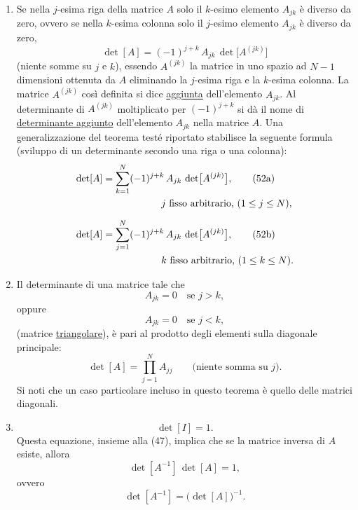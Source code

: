 \documentclass[11pt, a4paper]{book}
\numberwithin{equation}{section}
\begin{document}
\begin{enumerate}
\item Se nella $j$-esima riga della matrice $A$ solo il $k$-esimo elemento $A_{jk}$ è diverso da zero, ovvero se nella $k$-esima colonna solo il $j$-esimo elemento $A_{jk}$ è diverso da zero,
\begin{equation}
    \det[A] = (-1)^{j+k}\, A_{jk}\, \det\bigl[A^{(jk)}\bigr]
    \tag{51}
\end{equation}
(niente somme su $j$ e $k$), essendo $A^{(jk)}$ la matrice in uno spazio ad $N-1$ dimensioni ottenuta da $A$ eliminando la $j$-esima riga e la $k$-esima colonna. La matrice $A^{(jk)}$ così definita si dice \underline{aggiunta} dell'elemento $A_{jk}$. Al determinante di $A^{(jk)}$ moltiplicato per $(-1)^{j+k}$ si dà il nome di \underline{determinante aggiunto} dell'elemento $A_{jk}$ nella matrice $A$. Una generalizzazione del teorema testé riportato stabilisce la seguente formula (sviluppo di un determinante secondo una riga o una colonna):
\begin{align}
    \det[A] &= \sum_{k=1}^{N} (-1)^{j+k}\, A_{jk}\, \det\bigl[A^{(jk)}\bigr],
    \tag{52a} \\
    &\hspace{6em} j \text{ fisso arbitrario, } (1 \leq j \leq N), \notag \\[6pt]
    \det[A] &= \sum_{j=1}^{N} (-1)^{j+k}\, A_{jk}\, \det\bigl[A^{(jk)}\bigr],
    \tag{52b} \\
    &\hspace{6em} k \text{ fisso arbitrario, } (1 \leq k \leq N). \notag
\end{align}

\item Il determinante di una matrice tale che
\begin{equation}
    A_{jk} = 0 \quad \text{se } j > k,
    \tag{53a}
\end{equation}
oppure
\begin{equation}
    A_{jk} = 0 \quad \text{se } j < k,
    \tag{53b}
\end{equation}
(matrice \underline{triangolare}), è pari al prodotto degli elementi sulla diagonale principale:
\begin{equation}
    \det[A] = \prod_{j=1}^{N} A_{jj} \qquad \text{(niente somma su } j\text{)}.
    \tag{54}
\end{equation}
Si noti che un caso particolare incluso in questo teorema è quello delle matrici diagonali.

\item
\begin{equation}
    \det[I] = 1.
    \tag{55}
\end{equation}
Questa equazione, insieme alla (47), implica che se la matrice inversa di $A$ esiste, allora
\begin{equation}
    \det[A^{-1}]\, \det[A] = 1,
    \tag{56a}
\end{equation}
ovvero
\begin{equation}
    \det[A^{-1}] = \bigl(\det[A]\bigr)^{-1}.
    \tag{56b}
\end{equation}


\end{enumerate}
\end{document}
